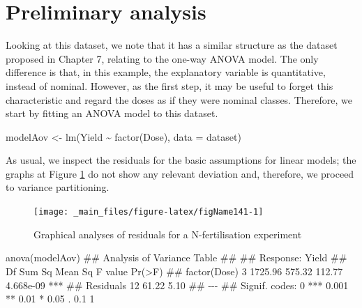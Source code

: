 \documentclass[a4paper,12pt,oneside]{book}
\newenvironment{Shaded}{\begin{snugshade}}{\end{snugshade}}
\newcommand{\SpecialCharTok}[1]{#1}
\newcommand{\DocumentationTok}[1]{#1}
\newcommand{\OtherTok}[1]{#1}
\newcommand{\FunctionTok}[1]{#1}
\newcommand{\AttributeTok}[1]{#1}
\newcommand{\NormalTok}[1]{#1}
\begin{document}
\hypertarget{preliminary-analysis}{%
\section{Preliminary analysis}\label{preliminary-analysis}}

Looking at this dataset, we note that it has a similar structure as the dataset proposed in Chapter 7, relating to the one-way ANOVA model. The only difference is that, in this example, the explanatory variable is quantitative, instead of nominal. However, as the first step, it may be useful to forget this characteristic and regard the doses as if they were nominal classes. Therefore, we start by fitting an ANOVA model to this dataset.

\begin{Shaded}
\begin{Highlighting}[]
\NormalTok{modelAov }\OtherTok{\textless{}{-}} \FunctionTok{lm}\NormalTok{(Yield }\SpecialCharTok{\textasciitilde{}} \FunctionTok{factor}\NormalTok{(Dose), }\AttributeTok{data =}\NormalTok{ dataset)}
\end{Highlighting}
\end{Shaded}

As usual, we inspect the residuals for the basic assumptions for linear models; the graphs at Figure \ref{fig:figName141} do not show any relevant deviation and, therefore, we proceed to variance partitioning.

\begin{figure}

{\centering \texttt{[image: \_main\_files/figure-latex/figName141-1]} 

}

\caption{Graphical analyses of residuals for a N-fertilisation experiment}\label{fig:figName141}
\end{figure}

\begin{Shaded}
\begin{Highlighting}[]
\FunctionTok{anova}\NormalTok{(modelAov)}
\DocumentationTok{\#\# Analysis of Variance Table}
\DocumentationTok{\#\# }
\DocumentationTok{\#\# Response: Yield}
\DocumentationTok{\#\#              Df  Sum Sq Mean Sq F value    Pr(\textgreater{}F)    }
\DocumentationTok{\#\# factor(Dose)  3 1725.96  575.32  112.77 4.668e{-}09 ***}
\DocumentationTok{\#\# Residuals    12   61.22    5.10                      }
\DocumentationTok{\#\# {-}{-}{-}}
\DocumentationTok{\#\# Signif. codes:  0 \textquotesingle{}***\textquotesingle{} 0.001 \textquotesingle{}**\textquotesingle{} 0.01 \textquotesingle{}*\textquotesingle{} 0.05 \textquotesingle{}.\textquotesingle{} 0.1 \textquotesingle{} \textquotesingle{} 1}
\end{Highlighting}
\end{Shaded}
\end{document}
